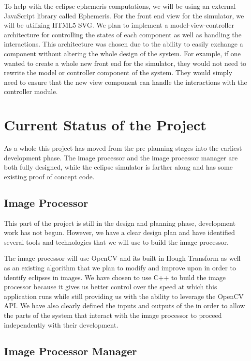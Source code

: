 \documentclass[10pt, onecolumn, draftclsnofoot, letterpaper, compsoc]{IEEEtran}
\begin{document}
To help with the eclipse ephemeris computations, we will be using an external
JavaScript library called Ephemeris. For the front end view for the simulator,
we will be utilizing HTML5 SVG. We plan to implement a model-view-controller
architecture for controlling the states of each component as well as handling
the interactions. This architecture was chosen due to the ability to easily
exchange a component without altering the whole design of the system. For
example, if one wanted to create a whole new front end for the simulator,
they would not need to rewrite the model or controller component of the system.
They would simply need to ensure that the new view component can handle the
interactions with the controller module.


\section{Current Status of the Project}

As a whole this project has moved from the pre-planning stages into the earliest
development phase. The image processor and the image processor manager are both
fully designed, while the eclipse simulator is farther along and has some existing proof of
concept code.

\subsection{Image Processor}

This part of the project is still in the design and planning phase, development
work has not begun. However, we have a clear design plan and have identified
several tools and technologies that we will use to build the image processor.

The image processor will use OpenCV and its built in Hough Transform as well as
an existing algorithm that we plan to modify and improve upon in order to
identify eclipses in images. We have chosen to use C++ to build the image
processor because it gives us better control over the speed at which this
application runs while still providing us with the ability to leverage the
OpenCV API. We have also clearly defined the inputs and outputs of the in order
to allow the parts of the system that interact with the image processor to
proceed independently with their development.

\subsection{Image Processor Manager}
\end{document}
